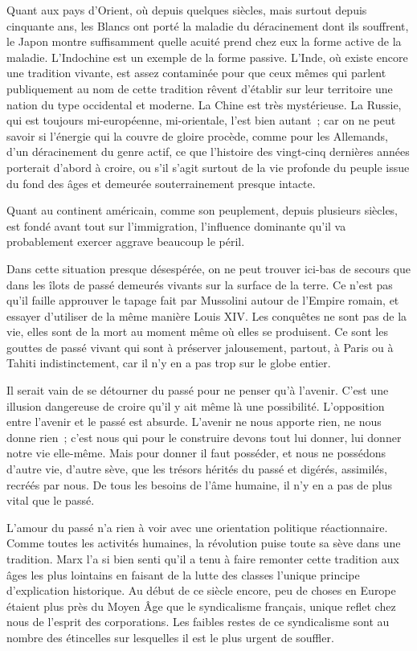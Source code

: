 \documentclass[french,twoside]{book} %
\begin{document}
Quant aux pays d'Orient, où depuis quelques siècles, mais surtout depuis cinquante ans, les Blancs ont porté la maladie du déracinement dont ils souffrent, le Japon montre suffisamment quelle acuité prend chez eux la forme active de la maladie. L'Indochine est un exemple de la forme passive. L'Inde, où existe encore une tradition vivante, est assez contaminée pour que ceux mêmes qui parlent publiquement au nom de cette tradition rêvent d'établir sur leur territoire une nation du type occidental et moderne. La Chine est très mystérieuse. La Russie, qui est toujours mi-européenne, mi-orientale, l'est bien autant ; car on ne peut savoir si l'énergie qui la couvre de gloire procède, comme pour les Allemands, d'un déracinement du genre actif, ce que l'histoire des vingt-cinq dernières années porterait d'abord à croire, ou s'il s'agit surtout de la vie profonde du peuple issue du fond des âges et demeurée souterrainement presque intacte.\par
Quant au continent américain, comme son peuplement, depuis plusieurs siècles, est fondé avant tout sur l'immigration, l'influence dominante qu'il va probablement exercer aggrave beaucoup le péril.\par
Dans cette situation presque désespérée, on ne peut trouver ici-bas de secours que dans les îlots de passé demeurés vivants sur la surface de la terre. Ce n'est pas qu'il faille approuver le tapage fait par Mussolini autour de l'Empire romain, et essayer d'utiliser de la même manière Louis XIV. Les conquêtes ne sont pas de la vie, elles sont de la mort au moment même où elles se produisent. Ce sont les gouttes de passé vivant qui sont à préserver jalousement, partout, à Paris ou à Tahiti indistinctement, car il n'y en a pas trop sur le globe entier.\par
Il serait vain de se détourner du passé pour ne penser qu'à l'avenir. C'est une illusion dangereuse de croire qu'il y ait même là une possibilité. L'opposition entre l'avenir et le passé est absurde. L'avenir ne nous apporte rien, ne nous donne rien ; c'est nous qui pour le construire devons tout lui donner, lui donner notre vie elle-même. Mais pour donner il faut posséder, et nous ne possédons d'autre vie, d'autre sève, que les trésors hérités du passé et digérés, assimilés, recréés par nous. De tous les besoins de l'âme humaine, il n'y en a pas de plus vital que le passé.\par
L'amour du passé n'a rien à voir avec une orientation politique réactionnaire. Comme toutes les activités humaines, la révolution puise toute sa sève dans une tradition. Marx l'a si bien senti qu'il a tenu à faire remonter cette tradition aux âges les plus lointains en faisant de la lutte des classes l'unique principe d'explication historique. Au début de ce siècle encore, peu de choses en Europe étaient plus près du Moyen Âge que le syndicalisme français, unique reflet chez nous de l'esprit des corporations. Les faibles restes de ce syndicalisme sont au nombre des étincelles sur lesquelles il est le plus urgent de souffler.\par
\end{document}
